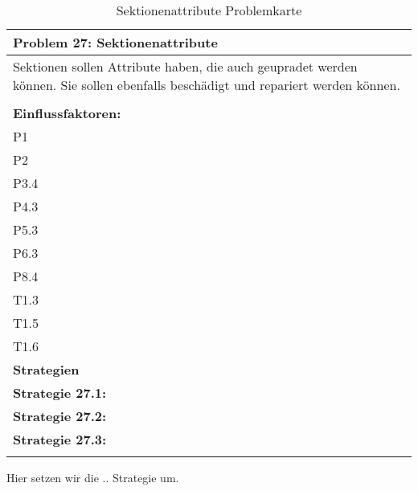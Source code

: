 \documentclass[fontsize=12pt,paper=a4,twoside]{scrartcl}
\begin{document}
\begin{table}[H]
    \centering
    \begin{tabular}{|p{15cm}|}
    \hline
          \textbf{Problem 27: Sektionenattribute}  \\ \hline
	Sektionen sollen Attribute haben, die auch geupradet werden können. Sie sollen ebenfalls beschädigt und repariert werden können. \\
         \\ \hline
          \textbf{Einflussfaktoren: } \\
	P1 \\
	P2 \\
	P3.4 \\
	P4.3 \\
	P5.3 \\
	P6.3 \\
	P8.4 \\
	T1.3 \\
	T1.5 \\
	T1.6 \\
          \hline
          \textbf{Strategien} \\ \hline
            {}          
           \label{strategie:27.1}     
          \textbf{Strategie 27.1:}  \\        
  {}          
           \label{strategie:27.2}              
          \textbf{Strategie 27.2:}  \\
	 {}          
           \label{strategie:27.3}     
          \textbf{Strategie 27.3: }  \\ 
	 \\ \hline
    \end{tabular}

    \caption{Sektionenattribute Problemkarte}
    \label{tab:ProblemKarte27}
\end{table}
Hier setzen wir die .. Strategie um.\\
\end{document}
